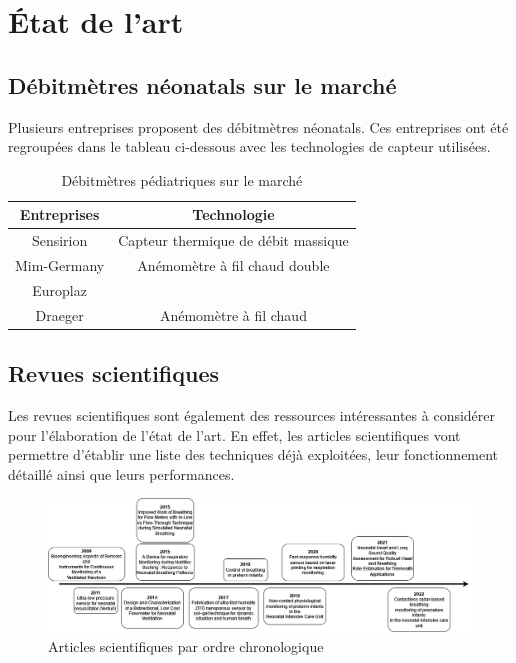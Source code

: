 \section{État de l'art}
\subsection{Débitmètres néonatals sur le marché}

Plusieurs entreprises proposent des débitmètres néonatals. Ces entreprises ont été regroupées dans le tableau ci-dessous avec les 
technologies de capteur utilisées. \\

\begin{table}[H]
    \centering
    \begin{tabular}{|c|c|}
        \hline
        Entreprises & Technologie                         \\
        \hline
        Sensirion   & Capteur thermique de débit massique \\
        \hline
        Mim-Germany & Anémomètre à fil chaud double       \\
        \hline
        Europlaz    &                                     \\
        \hline
        Draeger     & Anémomètre à fil chaud              \\
        \hline
    \end{tabular}
    \caption{Débitmètres pédiatriques sur le marché}
    \label{tab:debitmetreMarche}
\end{table}


\subsection{Revues scientifiques}
Les revues scientifiques sont également des ressources intéressantes à considérer pour l'élaboration de l'état de l'art. En effet, les 
articles scientifiques vont permettre d'établir une liste des techniques déjà exploitées, leur fonctionnement détaillé ainsi que leurs 
performances. \\
\begin{figure}[H]
    \hspace{-1cm}
    \includegraphics[scale = 0.45]{images/DRP_Etat_de_l_art.png}
    \caption{Articles scientifiques par ordre chronologique}
    \label{fig:articlesChrono}
\end{figure}

